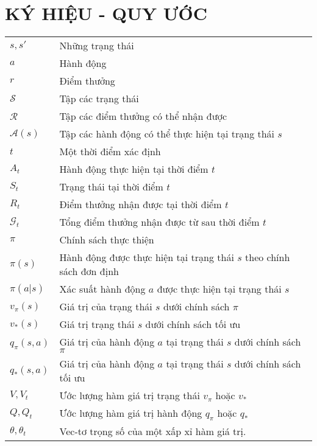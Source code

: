 \chapter*{KÝ HIỆU - QUY ƯỚC}
\begin{tabular}{ l l }
	$s, s'$ & Những trạng thái\\
	$a$ & Hành động\\
	$r$ & Điểm thưởng\\
	$\mathcal{S}$ & Tập các trạng thái\\
	$\mathcal{R}$ & Tập các điểm thưởng có thể nhận được\\
	$\mathcal{A}(s)$ & Tập các hành động có thể thực hiện tại trạng thái $s$\\
	$t$ & Một thời điểm xác định\\
	$\mathit{A}_{t}$ & Hành động thực hiện tại thời điểm $t$\\
	$\mathit{S}_{t}$ & Trạng thái tại thời điểm $t$\\
	$\mathit{R}_{t}$ & Điểm thưởng nhận được tại thời điểm $t$\\
	$\mathcal{G}_{t}$ & Tổng điểm thưởng nhận được từ sau thời điểm $t$\\
	$\pi$ & Chính sách thực thiện\\
	$\pi(s)$ & Hành động được thực hiện tại trạng thái $s$ theo chính sách đơn định\\
	$\pi(a|s)$ & Xác suất hành động $a$ được thực hiện tại trạng thái $s$\\
	$v_{\pi}(s)$ & Giá trị của trạng thái $s$ dưới chính sách $\pi$ \\
	$v_{*}(s)$ & Giá trị trạng thái $s$ dưới chính sách tối ưu \\
	$q_{\pi}(s,a)$ & Giá trị của hành động $a$ tại trạng thái $s$ dưới chính sách $\pi$\\
	$q_{*}(s,a)$ & Giá trị của hành động $a$ tại trạng thái $s$ dưới chính sách tối ưu\\
	$V, V_{t}$ & Ước lượng hàm giá trị trạng thái $v_{\pi}$ hoặc $v_{*}$\\
	$Q, Q_{t}$ & Ước lượng hàm giá trị hành động $q_{\pi}$ hoặc $q_{*}$\\
	$\theta, \theta_{t}$ & Vec-tơ trọng số của một xấp xỉ hàm giá trị.
\end{tabular}